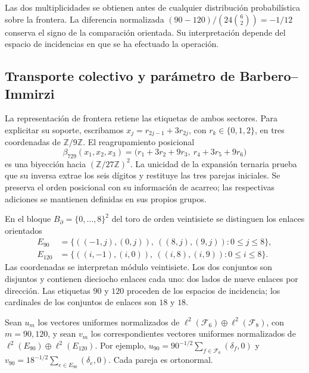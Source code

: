 Las dos multiplicidades se obtienen antes de cualquier distribución
probabilística sobre la frontera. La diferencia normalizada
\((90-120)/(24\binom62)=-1/12\) conserva el signo de la comparación
orientada. Su interpretación depende del espacio de incidencias en que
se ha efectuado la operación.

\subsection{Transporte colectivo y parámetro de Barbero--Immirzi}

La representación de frontera retiene las etiquetas de ambos sectores.
Para explicitar su soporte, escribamos
\(x_j=r_{2j-1}+3r_{2j}\), con \(r_k\in\{0,1,2\}\), en tres
coordenadas de \(\mathbb Z/9\mathbb Z\). El reagrupamiento posicional
\begin{equation}
 \beta_{729}(x_1,x_2,x_3)
 =\bigl(r_1+3r_2+9r_3,\ r_4+3r_5+9r_6\bigr)
 \label{rev4:ae:reagrupamiento}
\end{equation}
es una biyección hacia \((\mathbb Z/27\mathbb Z)^2\). La unicidad de
la expansión ternaria prueba que su inversa extrae los seis dígitos y
restituye las tres parejas iniciales. Se preserva el orden posicional
con su información de acarreo; las respectivas adiciones se mantienen
definidas en sus propios grupos.

En el bloque \(B_\partial=\{0,\ldots,8\}^2\) del toro de orden
veintisiete se distinguen los enlaces orientados
\begin{align}
 E_{90}&=\{((-1,j),(0,j)),\ ((8,j),(9,j)):0\le j\le8\},\\
 E_{120}&=\{((i,-1),(i,0)),\ ((i,8),(i,9)):0\le i\le8\}.
 \label{rev4:ae:enlaces}
\end{align}
Las coordenadas se interpretan módulo veintisiete. Los dos conjuntos
son disjuntos y contienen dieciocho enlaces cada uno: dos lados de
nueve enlaces por dirección. Las etiquetas \(90\) y \(120\) proceden
de los espacios de incidencia; los cardinales de los conjuntos de
enlaces son \(18\) y \(18\).

Sean \(u_m\) los vectores uniformes normalizados de
\(\ell^2(\mathcal F_6)\oplus\ell^2(\mathcal F_8)\), con
\(m=90,120\), y sean \(v_m\) los correspondientes vectores
uniformes normalizados de \(\ell^2(E_{90})\oplus\ell^2(E_{120})\).
Por ejemplo, \(u_{90}=90^{-1/2}\sum_{f\in\mathcal F_6}(\delta_f,0)\)
y \(v_{90}=18^{-1/2}\sum_{e\in E_{90}}(\delta_e,0)\).
Cada pareja es ortonormal.

